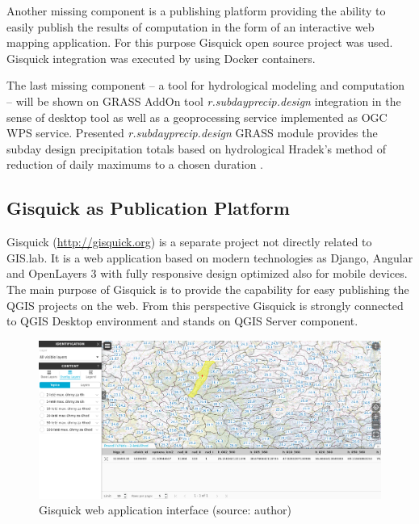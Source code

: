 \documentclass{isprs}
\begin{document}
Another missing component is a publishing platform providing the
ability to easily publish the results of computation in the form of an
interactive web mapping application. For this purpose Gisquick open
source project was used. Gisquick integration was executed by using
Docker containers.

The last missing component -- a tool for hydrological modeling and
computation -- will be shown on GRASS AddOn tool
\textit{r.subdayprecip.design} integration in the sense of desktop
tool as well as a geoprocessing service implemented as OGC WPS
service. Presented \textit{r.subdayprecip.design} GRASS module
provides the subday design precipitation totals based on hydrological
Hradek's method of reduction of daily maximums to a chosen duration
\cite{landa.2015:FOSS4GE2015}.

\subsection{Gisquick as Publication Platform}

Gisquick (\url{http://gisquick.org}) is a separate project not
directly related to GIS.lab. It is a web application based on modern
technologies as Django, Angular and OpenLayers 3 with fully responsive
design optimized also for mobile devices. The main purpose of Gisquick
is to provide the capability for easy publishing the QGIS projects on
the web. From this perspective Gisquick is strongly connected to QGIS
Desktop environment and stands on QGIS Server component.

\begin{figure}[ht!]
\begin{center}
  \includegraphics[width=0.9\columnwidth]{figures/gisquick-identify.png}
  \caption{Gisquick web application interface
    (source: author)}
\label{fig:gislab_infrastructure}
\end{center}
\end{figure}
\end{document}
